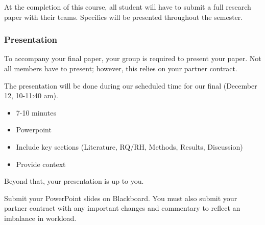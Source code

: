 \documentclass[
  b5paper]{book}
\begin{document}
At the completion of this course, all student will have to submit a full research paper with their teams. Specifics will be presented throughout the semester.

\hypertarget{presentation}{%
\subsubsection*{Presentation}\label{presentation}}

To accompany your final paper, your group is required to present your paper. Not all members have to present; however, this relies on your partner contract.

The presentation will be done during our scheduled time for our final (December 12, 10-11:40 am).~

\begin{itemize}
\item
  7-10 minutes
\item
  Powerpoint
\item
  Include key sections (Literature, RQ/RH, Methods, Results, Discussion)
\item
  Provide context
\end{itemize}

Beyond that, your presentation is up to you.

Submit your PowerPoint slides on Blackboard. You must also submit your partner contract with any important changes and commentary to reflect an imbalance in workload.

  
\end{document}
